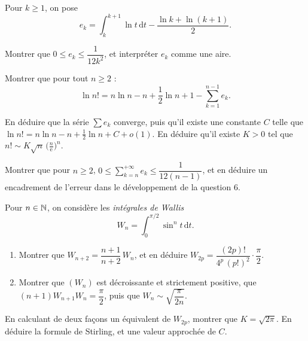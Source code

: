 \begin{exoEval}[Un développement de $\ln n!$]{}{}
Pour $k\geqslant1$, on pose
\[e_k=\int_k^{k+1}\ln t\,\mathrm{d}t-\frac{\ln k+\ln(k+1)}{2}.\]
\begin{questions}[start=4]
  \item Montrer que $0\leqslant e_k\leqslant\dfrac{1}{12k^{2}}$, et
    interpréter $e_k$ comme une aire.
  \item Montrer que pour tout $n\geqslant2$ :
    \[\ln n!=n\ln n-n+\frac12\ln n+1-\sum_{k=1}^{n-1}e_k.\]
  \item En déduire que la série $\sum e_k$ converge, puis qu'il existe une
    constante $C$ telle que
    $\ln n!=n\ln n-n+\frac12\ln n+C+o(1)$. En déduire qu'il existe $K>0$ tel
    que $n!\sim K\sqrt n\,\bigl(\frac n{\mathrm{e}}\bigr)^{n}$.
  \item Montrer que pour $n\geqslant2$,
    $0\leqslant\sum_{k=n}^{+\infty}e_k\leqslant\dfrac{1}{12(n-1)}$, et en
    déduire un encadrement de l'erreur dans le développement de la
    question 6.
\end{questions}
\end{exoEval}

\begin{exoEval}{}{}
Pour $n\in\mathbb{N}$, on considère les \emph{intégrales de Wallis}
\[W_n=\int_0^{\pi/2}\sin^{n}t\,\mathrm{d}t.\]
\begin{questions}[start=8]
  \item \begin{enumerate}[label=\alph*)]
      \item Montrer que $W_{n+2}=\dfrac{n+1}{n+2}\,W_n$, et en déduire
        $W_{2p}=\dfrac{(2p)!}{4^{p}\,(p!)^{2}}\cdot\dfrac\pi2$.
      \item Montrer que $(W_n)$ est décroissante et strictement positive,
        que $(n+1)W_{n+1}W_n=\dfrac\pi2$, puis que
        $W_n\sim\sqrt{\dfrac{\pi}{2n}}$.
    \end{enumerate}
  \item En calculant de deux façons un équivalent de $W_{2p}$, montrer que
    $K=\sqrt{2\pi}$. En déduire la formule de Stirling, et une valeur
    approchée de $C$.
\end{questions}
\end{exoEval}
